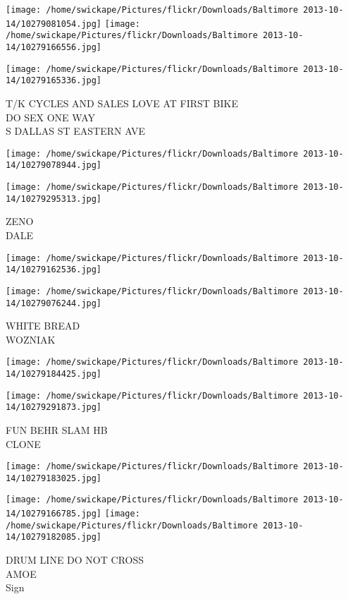 \documentclass[10pt,letterpaper]{article}
\begin{document}
\texttt{[image: /home/swickape/Pictures/flickr/Downloads/Baltimore 2013-10-14/10279081054.jpg]}
\texttt{[image: /home/swickape/Pictures/flickr/Downloads/Baltimore 2013-10-14/10279166556.jpg]}

\texttt{[image: /home/swickape/Pictures/flickr/Downloads/Baltimore 2013-10-14/10279165336.jpg]}

T/K CYCLES AND SALES LOVE AT FIRST BIKE\\
DO SEX ONE WAY\\
S DALLAS ST EASTERN AVE
\pagebreak

\texttt{[image: /home/swickape/Pictures/flickr/Downloads/Baltimore 2013-10-14/10279078944.jpg]}

\vspace{0.25in}
\texttt{[image: /home/swickape/Pictures/flickr/Downloads/Baltimore 2013-10-14/10279295313.jpg]}

ZENO\\
DALE
\pagebreak

\texttt{[image: /home/swickape/Pictures/flickr/Downloads/Baltimore 2013-10-14/10279162536.jpg]}

\vspace{0.25in}
\texttt{[image: /home/swickape/Pictures/flickr/Downloads/Baltimore 2013-10-14/10279076244.jpg]}

WHITE BREAD\\
WOZNIAK
\pagebreak

\texttt{[image: /home/swickape/Pictures/flickr/Downloads/Baltimore 2013-10-14/10279184425.jpg]}

\vspace{0.25in}
\texttt{[image: /home/swickape/Pictures/flickr/Downloads/Baltimore 2013-10-14/10279291873.jpg]}

FUN BEHR SLAM HB\\
CLONE
\pagebreak

\texttt{[image: /home/swickape/Pictures/flickr/Downloads/Baltimore 2013-10-14/10279183025.jpg]}

\vspace{0.25in}
\texttt{[image: /home/swickape/Pictures/flickr/Downloads/Baltimore 2013-10-14/10279166785.jpg]}
\texttt{[image: /home/swickape/Pictures/flickr/Downloads/Baltimore 2013-10-14/10279182085.jpg]}

DRUM LINE DO NOT CROSS\\
AMOE\\
Sign
\pagebreak
\end{document}
